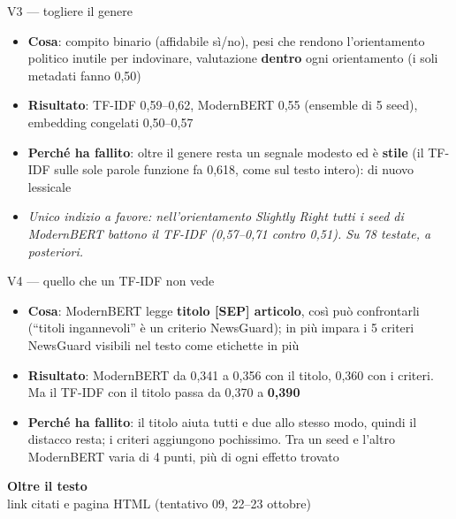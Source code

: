 \documentclass[aspectratio=169]{beamer}
\newcommand{\hl}[1]{\textbf{#1}}
\newcommand{\divider}[2]{%
  \begin{frame}[plain]
    \vfill
    \begin{center}
      {\color{dividerblue}\Huge\textbf{#1}}\\[0.8em]
      {\large #2}
    \end{center}
    \vfill
  \end{frame}}
\begin{document}
\begin{frame}{V3 --- togliere il genere}
  \begin{itemize}
    \setlength\itemsep{0.6em}
    \item \hl{Cosa}: compito binario (affidabile s\`i/no), pesi che rendono l'orientamento politico inutile per indovinare, valutazione \hl{dentro} ogni orientamento (i soli metadati fanno 0,50)
    \item \hl{Risultato}: TF-IDF 0,59--0,62, ModernBERT 0,55 (ensemble di 5 seed), embedding congelati 0,50--0,57
    \item \hl{Perch\'e ha fallito}: oltre il genere resta un segnale modesto ed \`e \hl{stile} (il TF-IDF sulle sole parole funzione fa 0,618, come sul testo intero): di nuovo lessicale
    \item[] {\small\itshape Unico indizio a favore: nell'orientamento Slightly Right tutti i seed di ModernBERT battono il TF-IDF (0,57--0,71 contro 0,51). Su 78 testate, a posteriori.}
  \end{itemize}
\end{frame}

\begin{frame}{V4 --- quello che un TF-IDF non vede}
  \begin{itemize}
    \setlength\itemsep{0.6em}
    \item \hl{Cosa}: ModernBERT legge \hl{titolo [SEP] articolo}, cos\`i pu\`o confrontarli (``titoli ingannevoli'' \`e un criterio NewsGuard); in pi\`u impara i 5 criteri NewsGuard visibili nel testo come etichette in pi\`u
    \item \hl{Risultato}: ModernBERT da 0,341 a 0,356 con il titolo, 0,360 con i criteri. Ma il TF-IDF con il titolo passa da 0,370 a \hl{0,390}
    \item \hl{Perch\'e ha fallito}: il titolo aiuta tutti e due allo stesso modo, quindi il distacco resta; i criteri aggiungono pochissimo. Tra un seed e l'altro ModernBERT varia di 4 punti, pi\`u di ogni effetto trovato
  \end{itemize}
\end{frame}

\divider{Oltre il testo}{link citati e pagina HTML (tentativo 09, 22--23 ottobre)}
\end{document}
